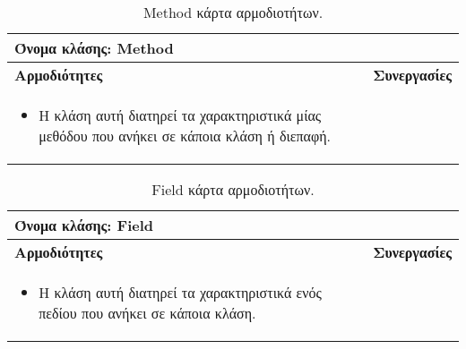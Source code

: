 \begin{table}[H]
    \centering
    \begin{tabular}{|p{5cm}|p{5cm}|}
        \hline
        \multicolumn{2}{|l|}{Όνομα κλάσης: Method} \\
        \hline
        \textbf{Αρμοδιότητες} & \textbf{Συνεργασίες} \\
        \hline
        \begin{itemize}
            \item Η κλάση αυτή διατηρεί τα χαρακτηριστικά μίας μεθόδου που ανήκει σε κάποια κλάση ή διεπαφή.
        \end{itemize} &    
        \\
        \hline
    \end{tabular}
    \caption{Method κάρτα αρμοδιοτήτων.}
    \label{tab:MethodCRC}
\end{table}
\begin{table}[H]
    \centering
    \begin{tabular}{|p{5cm}|p{5cm}|}
        \hline
        \multicolumn{2}{|l|}{Όνομα κλάσης: Field} \\
        \hline
        \textbf{Αρμοδιότητες} & \textbf{Συνεργασίες} \\
        \hline
        \begin{itemize}
            \item Η κλάση αυτή διατηρεί τα χαρακτηριστικά ενός πεδίου που ανήκει σε κάποια κλάση.
        \end{itemize} &   
        \\
        \hline
    \end{tabular}
    \caption{Field κάρτα αρμοδιοτήτων.}
    \label{tab:FieldCRC}
\end{table}
